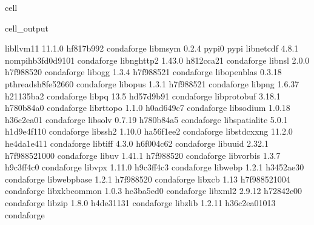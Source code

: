 \documentclass[letterpaper,table,10pt,english]{jupyterBook}
\begin{document}
\begin{sphinxuseclass}{cell}
\begin{sphinxVerbatimOutput}
\begin{sphinxuseclass}{cell_output}
\begin{sphinxVerbatim}[commandchars=\\\{\}]
libllvm11                 11.1.0               hf817b99\PYGZus{}2    conda\PYGZhy{}forge
libmsym                   0.2.4                    pypi\PYGZus{}0    pypi
libnetcdf                 4.8.1           nompi\PYGZus{}hb3fd0d9\PYGZus{}101    conda\PYGZhy{}forge
libnghttp2                1.43.0               h812cca2\PYGZus{}1    conda\PYGZhy{}forge
libnsl                    2.0.0                h7f98852\PYGZus{}0    conda\PYGZhy{}forge
libogg                    1.3.4                h7f98852\PYGZus{}1    conda\PYGZhy{}forge
libopenblas               0.3.18          pthreads\PYGZus{}h8fe5266\PYGZus{}0    conda\PYGZhy{}forge
libopus                   1.3.1                h7f98852\PYGZus{}1    conda\PYGZhy{}forge
libpng                    1.6.37               h21135ba\PYGZus{}2    conda\PYGZhy{}forge
libpq                     13.5                 hd57d9b9\PYGZus{}1    conda\PYGZhy{}forge
libprotobuf               3.18.1               h780b84a\PYGZus{}0    conda\PYGZhy{}forge
librttopo                 1.1.0                h0ad649c\PYGZus{}7    conda\PYGZhy{}forge
libsodium                 1.0.18               h36c2ea0\PYGZus{}1    conda\PYGZhy{}forge
libsolv                   0.7.19               h780b84a\PYGZus{}5    conda\PYGZhy{}forge
libspatialite             5.0.1               h1d9e4f1\PYGZus{}10    conda\PYGZhy{}forge
libssh2                   1.10.0               ha56f1ee\PYGZus{}2    conda\PYGZhy{}forge
libstdcxx\PYGZhy{}ng              11.2.0              he4da1e4\PYGZus{}11    conda\PYGZhy{}forge
libtiff                   4.3.0                h6f004c6\PYGZus{}2    conda\PYGZhy{}forge
libuuid                   2.32.1            h7f98852\PYGZus{}1000    conda\PYGZhy{}forge
libuv                     1.41.1               h7f98852\PYGZus{}0    conda\PYGZhy{}forge
libvorbis                 1.3.7                h9c3ff4c\PYGZus{}0    conda\PYGZhy{}forge
libvpx                    1.11.0               h9c3ff4c\PYGZus{}3    conda\PYGZhy{}forge
libwebp                   1.2.1                h3452ae3\PYGZus{}0    conda\PYGZhy{}forge
libwebp\PYGZhy{}base              1.2.1                h7f98852\PYGZus{}0    conda\PYGZhy{}forge
libxcb                    1.13              h7f98852\PYGZus{}1004    conda\PYGZhy{}forge
libxkbcommon              1.0.3                he3ba5ed\PYGZus{}0    conda\PYGZhy{}forge
libxml2                   2.9.12               h72842e0\PYGZus{}0    conda\PYGZhy{}forge
libzip                    1.8.0                h4de3113\PYGZus{}1    conda\PYGZhy{}forge
libzlib                   1.2.11            h36c2ea0\PYGZus{}1013    conda\PYGZhy{}forge

\end{sphinxVerbatim}
\end{sphinxuseclass}
\end{sphinxVerbatimOutput}
\end{sphinxuseclass}
\end{document}
